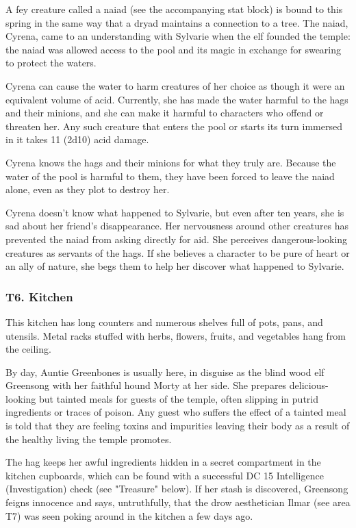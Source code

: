 \documentclass[10pt,a4paper,twoside,bg=print,twocolumn,openany,nodeprecatedcode]{dndbook}
\begin{document}
A fey creature called a naiad (see the accompanying stat block) is bound to this spring in the same way that a dryad maintains a connection to a tree. The naiad, Cyrena, came to an understanding with Sylvarie when the elf founded the temple: the naiad was allowed access to the pool and its magic in exchange for swearing to protect the waters.

Cyrena can cause the water to harm creatures of her choice as though it were an equivalent volume of acid. Currently, she has made the water harmful to the hags and their minions, and she can make it harmful to characters who offend or threaten her. Any such creature that enters the pool or starts its turn immersed in it takes 11 (2d10) acid damage.

Cyrena knows the hags and their minions for what they truly are. Because the water of the pool is harmful to them, they have been forced to leave the naiad alone, even as they plot to destroy her.

Cyrena doesn't know what happened to Sylvarie, but even after ten years, she is sad about her friend's disappearance. Her nervousness around other creatures has prevented the naiad from asking directly for aid. She perceives dangerous-looking creatures as servants of the hags. If she believes a character to be pure of heart or an ally of nature, she begs them to help her discover what happened to Sylvarie.

\subsubsection{T6. Kitchen}
\begin{DndReadAloud}{}
This kitchen has long counters and numerous shelves full of pots, pans, and utensils. Metal racks stuffed with herbs, flowers, fruits, and vegetables hang from the ceiling.

\end{DndReadAloud}

By day, Auntie Greenbones is usually here, in disguise as the blind wood elf Greensong with her faithful hound Morty at her side. She prepares delicious-looking but tainted meals for guests of the temple, often slipping in putrid ingredients or traces of poison. Any guest who suffers the effect of a tainted meal is told that they are feeling toxins and impurities leaving their body as a result of the healthy living the temple promotes.

The hag keeps her awful ingredients hidden in a secret compartment in the kitchen cupboards, which can be found with a successful DC 15 Intelligence (Investigation) check (see "Treasure" below). If her stash is discovered, Greensong feigns innocence and says, untruthfully, that the drow aesthetician Ilmar (see area T7) was seen poking around in the kitchen a few days ago.
\end{document}
